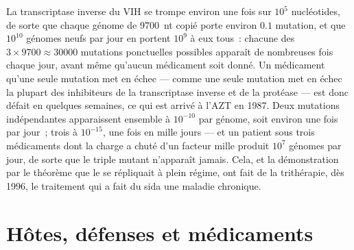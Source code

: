 \begin{example}\label{ex:b3:virology:three-drugs}
La transcriptase inverse du VIH se trompe environ une fois sur $10^{5}$
nucléotides, de sorte que chaque génome de \qty{9700}{nt} copié porte
environ $0.1$ mutation, et que $10^{10}$ génomes neufs par jour en
portent $10^{9}$ à eux tous~: chacune des
$3\times 9700 \approx \num{30000}$ mutations ponctuelles possibles
apparaît de nombreuses fois chaque jour, avant même qu'aucun médicament
soit donné. Un médicament qu'une seule mutation met en échec --- comme
une seule mutation met en échec la plupart des inhibiteurs de la
transcriptase inverse et de la protéase --- est donc défait en quelques
semaines, ce qui est arrivé à l'AZT en 1987. Deux mutations
indépendantes apparaissent ensemble à $10^{-10}$ par génome, soit
environ une fois par jour~; trois à $10^{-15}$, une fois en mille jours
--- et un patient sous trois médicaments dont la charge a chuté d'un
facteur mille produit $10^{7}$ génomes par jour, de sorte que le triple
mutant n'apparaît jamais. Cela, et la démonstration par le théorème que
le  se répliquait à plein régime, ont fait de la trithérapie, dès
1996, le traitement qui a fait du sida une maladie chronique.
\end{example}

\section{Hôtes, défenses et médicaments}

